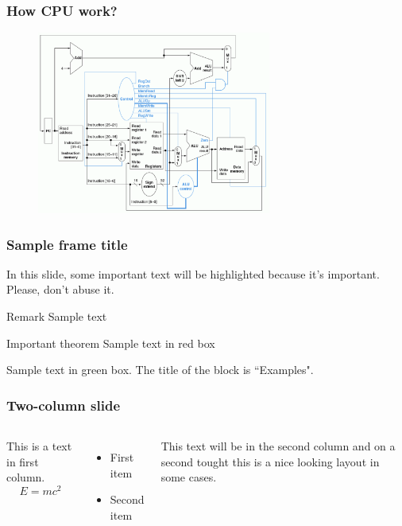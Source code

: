 \documentclass{beamer}
\begin{document}
\begin{frame}
\frametitle{How CPU work?}
\begin{figure}[h!]
  \includegraphics[height=6cm]{img/single_cycle_datapath.png}
\end{figure}

\end{frame}

\begin{frame}
\frametitle{Sample frame title}

In this slide, some important text will be
\alert{highlighted} because it's important.
Please, don't abuse it.

\begin{block}{Remark}
Sample text
\end{block}

\begin{alertblock}{Important theorem}
Sample text in red box
\end{alertblock}

\begin{examples}
Sample text in green box. The title of the block is ``Examples".
\end{examples}
\end{frame}


\begin{frame}
\frametitle{Two-column slide}

\begin{columns}

This is a text in first column.
$$E=mc^2$$
\begin{itemize}
\item First item
\item Second item
\end{itemize}

This text will be in the second column
and on a second tought this is a nice looking
layout in some cases.
\end{columns}
\end{frame}
\end{document}

